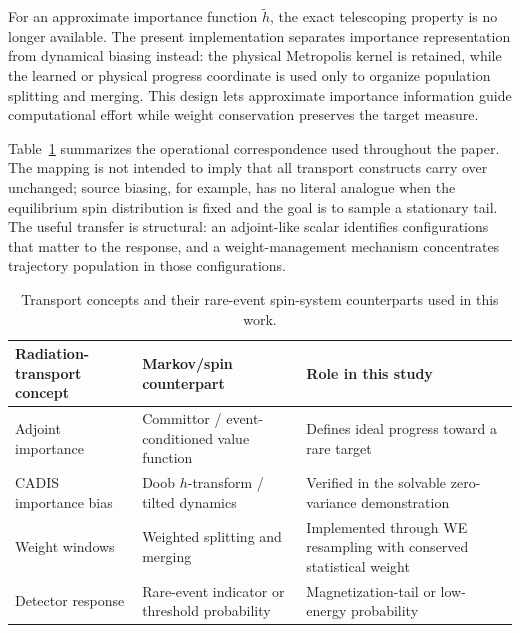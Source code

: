 \documentclass[a4paper,fleqn]{cas-sc}
\begin{document}
For an approximate importance function $\tilde h$, the exact telescoping property is no
longer available. The present implementation separates importance representation from
dynamical biasing instead: the physical Metropolis kernel is retained, while the learned or
physical progress coordinate is used only to organize population splitting and merging. This
design lets approximate importance information guide computational effort while weight
conservation preserves the target measure.

Table~\ref{tab:map} summarizes the operational correspondence used throughout the paper. The
mapping is not intended to imply that all transport constructs carry over unchanged; source
biasing, for example, has no literal analogue when the equilibrium spin distribution is fixed
and the goal is to sample a stationary tail. The useful transfer is structural: an
adjoint-like scalar identifies configurations that matter to the response, and a
weight-management mechanism concentrates trajectory population in those configurations.

\begin{table}[H]
\centering\small
\caption{Transport concepts and their rare-event spin-system counterparts used in this work.}
\label{tab:map}
\begin{tabular}{p{}p{}p{}}
\toprule
Radiation-transport concept & Markov/spin counterpart & Role in this study \\
\midrule
Adjoint importance & Committor / event-conditioned value function & Defines ideal progress
toward a rare target \\
CADIS importance bias & Doob $h$-transform / tilted dynamics & Verified in the solvable
zero-variance demonstration \\
Weight windows & Weighted splitting and merging & Implemented through WE resampling with
conserved statistical weight \\
Detector response & Rare-event indicator or threshold probability & Magnetization-tail or
low-energy probability \\
\bottomrule
\end{tabular}
\end{table}
\end{document}
